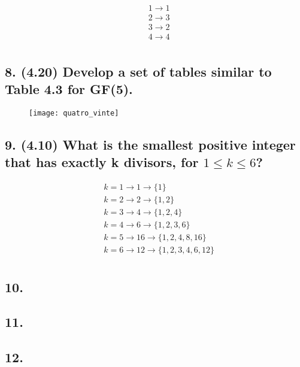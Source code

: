 \documentclass[fleqn, 12pt]{article}
\begin{document}
    \begin{align*}
      & 1 \rightarrow 1 \\
      & 2 \rightarrow 3 \\
      & 3 \rightarrow 2 \\
      & 4 \rightarrow 4 \\
    \end{align*}

\subsection*{8. (4.20) Develop a set of tables similar to Table 4.3 for GF(5).}
  \begin{figure}[h]
    \texttt{[image: quatro\_vinte]}
  \end{figure}

\subsection*{9. (4.10) What is the smallest positive integer that has exactly k divisors, for $1 \leq k \leq 6$?}
  \begin{align*}
    & k = 1 \rightarrow 1 \rightarrow \lbrace 1 \rbrace \\
    & k = 2 \rightarrow 2 \rightarrow \lbrace 1, 2 \rbrace \\
    & k = 3 \rightarrow 4 \rightarrow \lbrace 1, 2, 4 \rbrace \\
    & k = 4 \rightarrow 6 \rightarrow \lbrace 1, 2, 3, 6 \rbrace \\
    & k = 5 \rightarrow 16 \rightarrow \lbrace 1, 2, 4, 8, 16 \rbrace \\
    & k = 6 \rightarrow 12 \rightarrow \lbrace 1, 2, 3, 4, 6, 12 \rbrace \\
  \end{align*}

\subsection*{10.}

\subsection*{11.}

\subsection*{12.}
\end{document}
